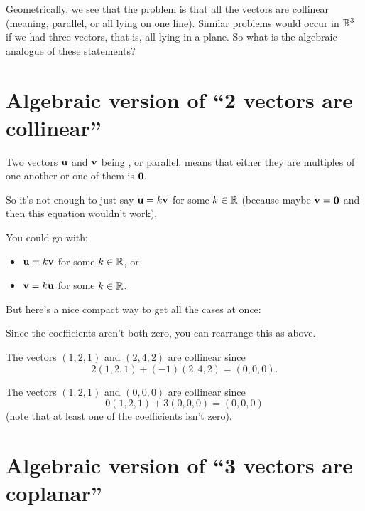 
Geometrically, we see that the problem is that all the vectors are
collinear (meaning, parallel, or all lying on one line).  Similar
problems would occur in $\mathbb{R}^3$ if we had three  vectors,
that is, all lying in a plane.  So what is the algebraic analogue
of these statements?

\section{Algebraic version of ``2 vectors are collinear''}

Two vectors $\mathbf{u}$ and $\mathbf{v}$ being , or parallel, means that 
either they are multiples of one another or one of them is $\mathbf{0}$.

So it's not enough to just say $\mathbf{u} = k \mathbf{v}$ for some $k\in \mathbb{R}$ (because
maybe $\mathbf{v} = \mathbf{0}$ and then this equation wouldn't work).

You could go with:
\begin{itemize}
\item $\mathbf{u} = k \mathbf{v}$ for some $k\in \mathbb{R}$, or
\item $\mathbf{v} = k \mathbf{u}$ for some $k\in \mathbb{R}$.
\end{itemize}
But here's a nice compact way to get all the cases at once:


Since the coefficients aren't both zero, you can rearrange this
as above. 

\begin{myexample}
The vectors $(1,2,1)$ and $(2,4,2)$ are collinear since
$$
2(1,2,1) + (-1)(2,4,2) = (0,0,0).
$$\end{myexample}

\begin{myexample} The vectors $(1,2,1)$ and $(0,0,0)$ are collinear since
$$
0(1,2,1) + 3(0,0,0)= (0,0,0)
$$
(note that at least one of the coefficients isn't zero). \end{myexample}

\section{Algebraic version of ``3 vectors are coplanar''}

